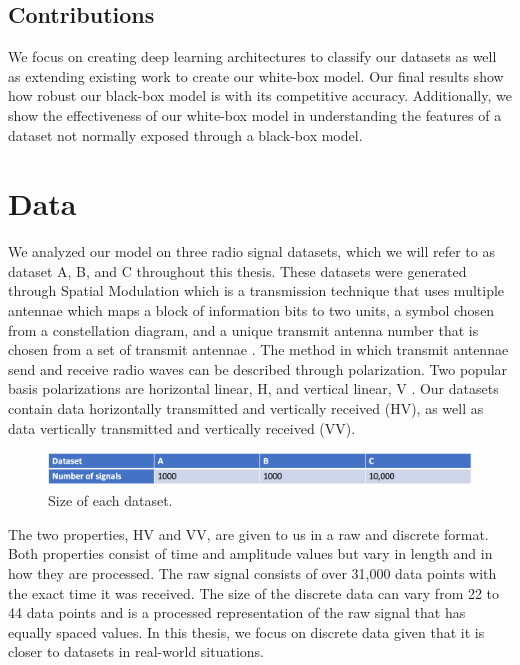 \documentclass{turabian-thesis}
\begin{document}
\section{Contributions}
We focus on creating deep learning architectures to classify our datasets as well as extending existing work to create our white-box model. Our final results show how robust our black-box model is with its competitive accuracy. Additionally, we show the effectiveness of our white-box model in understanding the features of a dataset not normally exposed through a black-box model.


\chapter{Data}

We analyzed our model on three radio signal datasets, which we will refer to as dataset A, B, and C throughout this thesis. These datasets were generated through Spatial Modulation which is a transmission technique that uses multiple antennae which maps a block of information bits to two units, a symbol chosen from a constellation diagram, and a unique transmit antenna number that is chosen from a set of transmit antennae \cite{mesleh_spatial_2008}. The method in which transmit antennae send and receive radio waves can be described through polarization. Two popular basis polarizations are horizontal linear, H, and vertical linear, V \cite{oshea_convolutional_2016}. Our datasets contain data horizontally transmitted and vertically received (HV), as well as data vertically transmitted and vertically received (VV).

\begin{figure}[h!]
   \begin{center}
      \includegraphics[scale=0.5]{../media/dataset_info.png}
   \end{center}
   \caption{Size of each dataset.}
   \label{fig:stft_example}
\end{figure}

The two properties, HV and VV, are given to us in a raw and discrete format. Both properties consist of time and amplitude values but vary in length and in how they are processed. The raw signal consists of over 31,000 data points with the exact time it was received. The size of the discrete data can vary from 22 to 44 data points and is a processed representation of the raw signal that has equally spaced values. In this thesis, we focus on discrete data given that it is closer to datasets in real-world situations.
\end{document}
